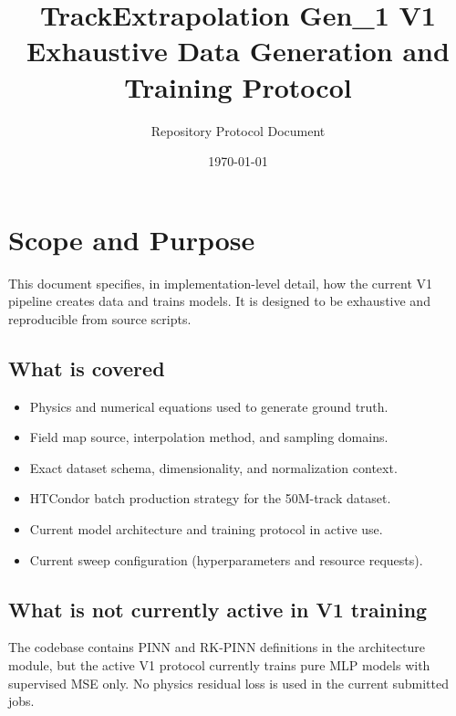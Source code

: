 \documentclass[11pt,a4paper]{article}
\title{TrackExtrapolation Gen\_1 V1\\Exhaustive Data Generation and Training Protocol}
\author{Repository Protocol Document}
\date{\today}
\begin{document}
\maketitle
\tableofcontents
\newpage

\section{Scope and Purpose}
This document specifies, in implementation-level detail, how the current V1 pipeline creates data and trains models.
It is designed to be exhaustive and reproducible from source scripts.

\subsection{What is covered}
\begin{itemize}[leftmargin=*]
  \item Physics and numerical equations used to generate ground truth.
  \item Field map source, interpolation method, and sampling domains.
  \item Exact dataset schema, dimensionality, and normalization context.
  \item HTCondor batch production strategy for the 50M-track dataset.
  \item Current model architecture and training protocol in active use.
  \item Current sweep configuration (hyperparameters and resource requests).
\end{itemize}

\subsection{What is not currently active in V1 training}
The codebase contains PINN and RK-PINN definitions in the architecture module, but the active V1 protocol currently trains pure MLP models with supervised MSE only. No physics residual loss is used in the current submitted jobs.
\end{document}
